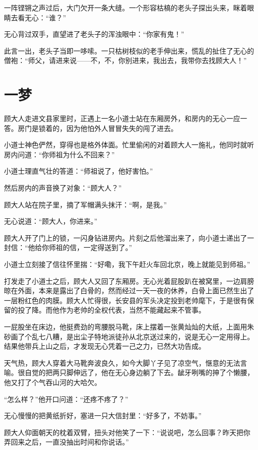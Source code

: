 一阵铿锵之声过后，大门欠开一条大缝。一个形容枯槁的老头子探出头来，眯着眼睛去看无心：``谁？''

无心背过双手，直望进了老头子的浑浊眼中：``你家有鬼！''

此言一出，老头子当即一哆嗦。一只枯树枝似的老手伸出来，慌乱的扯住了无心的僧袍：``师父，请进来说——不，不，你别进来，我出去，我带你去找顾大人！''

\chapter{一梦}

顾大人走进文县家里时，正遇上一名小道士站在东厢房外，和房内的无心一应一答。房门是锁着的，因为他怕外人冒冒失失的闯了进去。

小道士神色俨然，穿得也是格外体面。忙里偷闲的对着顾大人一施礼，他同时就听房内问道：``你师祖为什么不回来？''

小道士理直气壮的答道：``师祖说了，他好害怕。''

然后房内的声音换了对象：``顾大人？''

顾大人站在院子里，摘了军帽满头抹汗：``啊，是我。''

无心说道：``顾大人，你进来。''

顾大人开了门上的锁，一闪身钻进房内。片刻之后他溜出来了，向小道士递出了一封信：``他给你师祖的信，一定得送到了。''

小道士立刻接了信往怀里揣：``好嘞，我下午赶火车回北京，晚上就能见到师祖。''

打发走了小道士之后，顾大人又回了东厢房。无心光着屁股趴在被窝里，一边肩膀晾在外面，本来是露出了白骨的，然而经过一天一夜的休养，白骨上面已然生出了一层粉红色的肉膜。顾大人忙得很，长安县的军头决定投到老帅麾下，于是很有保留的投了降。而他作为老帅的全权代表，当然不能藏起来不管事。

一屁股坐在床边，他挺费劲的弯腰脱马靴，床上摆着一张黄灿灿的大纸，上面用朱砂画了个乱七八糟，是出尘子特地派徒孙从北京送过来的，说是无心一定用得上。结果他带兵上山之后，才发现无心凭着一己之力，已然大功告成。

天气热，顾大人穿着大马靴奔波良久，如今大脚丫子见了凉空气，惬意的无法言喻。很自觉的把两只脚伸远了，他在无心身边躺了下去。龇牙咧嘴的抻了个懒腰，他又打了个气吞山河的大哈欠。

``怎么样？''他开口问道：``还疼不疼了？''

无心慢慢的把黄纸折好，塞进一只大信封里：``好多了，不妨事。''

顾大人仰面朝天的枕着双臂，扭头对他笑了一下：``说说吧，怎么回事？昨天把你弄回来之后，一直没抽出时间和你说话。''

